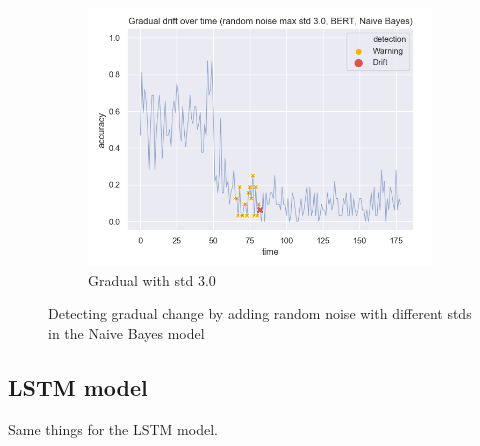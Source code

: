 \documentclass[12pt]{extreport}
\begin{document}
\begin{figure}[H]
\begin{subfigure}{.5\textwidth}
\end{subfigure}
\begin{subfigure}{.5\textwidth}
  \centering
  \includegraphics[width=\linewidth]{assets/detecting-change/gradual_noise_random_std_3_nb_wos_1_BERT.png}
  \caption{Gradual with std 3.0}
  \label{fig:nb-gradual-std-3}
\end{subfigure}
\caption{Detecting gradual change by adding random noise with different stds in the Naive Bayes model}
\label{fig:nb-gradual}
\end{figure}

\subsection{LSTM model}

Same things for the LSTM model.
\end{document}
